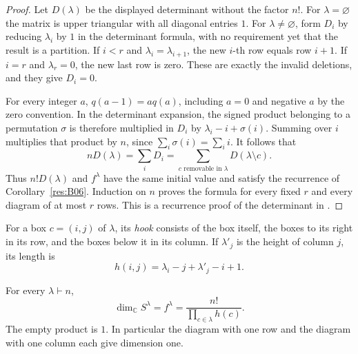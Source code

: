 \begin{proof}
Let \(D(\lambda)\) be the displayed determinant without the factor
\(n!\). For \(\lambda=\varnothing\) the matrix is upper triangular
with all diagonal entries \(1\). For \(\lambda\ne\varnothing\),
form \(D_i\) by reducing \(\lambda_i\) by \(1\) in the determinant
formula, with no requirement yet that the result is a partition.
If \(i<r\) and \(\lambda_i=\lambda_{i+1}\), the new \(i\)-th row
equals row \(i+1\). If \(i=r\) and \(\lambda_r=0\), the new last row
is zero. These are exactly the invalid deletions, and they give
\(D_i=0\).

For every integer \(a\), \(q(a-1)=a q(a)\), including \(a=0\) and
negative \(a\) by the zero convention. In the determinant expansion,
the signed product belonging to a permutation \(\sigma\) is
therefore multiplied in \(D_i\) by \(\lambda_i-i+\sigma(i)\).
Summing over \(i\) multiplies that product by \(n\), since
\(\sum_i\sigma(i)=\sum_i i\). It follows that
\[
    n D(\lambda)=\sum_i D_i
      =\sum_{c\text{ removable in }\lambda}D(\lambda\setminus c).
\]
Thus \(n!D(\lambda)\) and \(f^\lambda\) have the same initial value
and satisfy the recurrence of Corollary~\ref{res:B06}. Induction on \(n\)
proves the formula for every fixed \(r\) and every diagram of at
most \(r\) rows. This is a recurrence proof of the determinant
in \cite[Theorem 3.11.1]{sagan}.
\end{proof}

For a box \(c=(i,j)\) of \(\lambda\), its \emph{hook} consists of the
box itself, the boxes to its right in its row, and the boxes below it
in its column. If \(\lambda'_j\) is the height of column \(j\), its
length is
\[
    h(i,j)=\lambda_i-j+\lambda'_j-i+1.
\]

\begin{theorem}\label{res:B08}
For every \(\lambda\vdash n\),
\[
      \dim_{\mathbb C} S^\lambda
        = f^\lambda
        = \frac{n!}{\displaystyle\prod_{c\in\lambda}h(c)} .
\]
The empty product is \(1\). In particular the diagram with one row
and the diagram with one column each give dimension one.
\end{theorem}

